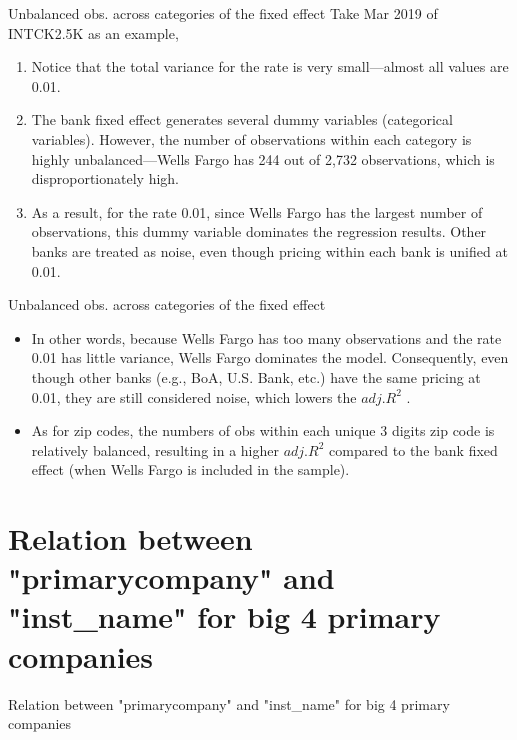 \documentclass{beamer}
\begin{document}
\begin{frame}{Unbalanced obs. across categories of the fixed effect}
\small
Take Mar 2019 of INTCK2.5K as an example, 

\begin{enumerate}
    \item Notice that the total variance for the rate is very small—almost all values are 0.01.
    \item The bank fixed effect generates several dummy variables (categorical variables). However, the number of observations within each category is highly unbalanced—Wells Fargo has 244 out of 2,732 observations, which is disproportionately high.
    \item As a result, for the rate 0.01, since Wells Fargo has the largest number of observations, this dummy variable dominates the regression results. Other banks are treated as noise, even though pricing within each bank is unified at 0.01.
\end{enumerate}

\end{frame}


\begin{frame}{Unbalanced obs. across categories of the fixed effect}
\small
\begin{itemize}
    \item In other words, because Wells Fargo has too many observations and the rate 0.01 has little variance, Wells Fargo dominates the model. Consequently, even though other banks (e.g., BoA, U.S. Bank, etc.) have the same pricing at 0.01, they are still considered noise, which lowers the $adj.R^2$ .
    \item As for zip codes, the numbers of obs within each unique 3 digits zip code is relatively balanced, resulting in a higher $adj.R^{2}$  compared to the bank fixed effect (when Wells Fargo is included in the sample).
\end{itemize}
    
\end{frame}


\section{Relation between "primarycompany" and "inst\_name" for big 4 primary companies}


\begin{frame}
    \vfill
    \centering
    {Relation between "primarycompany" and "inst\_name" for big 4 primary companies}
    \vfill
\end{frame}
\end{document}
